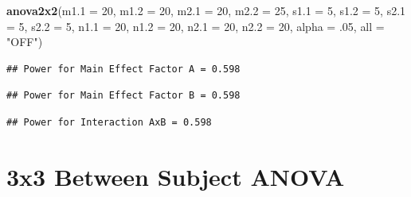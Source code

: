 \documentclass[]{book}
\newenvironment{Shaded}{\begin{snugshade}}{\end{snugshade}}
\newcommand{\DataTypeTok}[1]{\textcolor[rgb]{0.13,0.29,0.53}{#1}}
\newcommand{\DecValTok}[1]{\textcolor[rgb]{0.00,0.00,0.81}{#1}}
\newcommand{\FloatTok}[1]{\textcolor[rgb]{0.00,0.00,0.81}{#1}}
\newcommand{\KeywordTok}[1]{\textcolor[rgb]{0.13,0.29,0.53}{\textbf{#1}}}
\newcommand{\NormalTok}[1]{#1}
\newcommand{\StringTok}[1]{\textcolor[rgb]{0.31,0.60,0.02}{#1}}
\begin{document}
\begin{Shaded}
\begin{Highlighting}[]
\KeywordTok{anova2x2}\NormalTok{(}\DataTypeTok{m1.1 =} \DecValTok{20}\NormalTok{,}
         \DataTypeTok{m1.2 =} \DecValTok{20}\NormalTok{,}
         \DataTypeTok{m2.1 =} \DecValTok{20}\NormalTok{,}
         \DataTypeTok{m2.2 =} \DecValTok{25}\NormalTok{,}
         \DataTypeTok{s1.1 =} \DecValTok{5}\NormalTok{,}
         \DataTypeTok{s1.2 =} \DecValTok{5}\NormalTok{,}
         \DataTypeTok{s2.1 =} \DecValTok{5}\NormalTok{,}
         \DataTypeTok{s2.2 =} \DecValTok{5}\NormalTok{,}
         \DataTypeTok{n1.1 =} \DecValTok{20}\NormalTok{,}
         \DataTypeTok{n1.2 =} \DecValTok{20}\NormalTok{,}
         \DataTypeTok{n2.1 =} \DecValTok{20}\NormalTok{,}
         \DataTypeTok{n2.2 =} \DecValTok{20}\NormalTok{,}
         \DataTypeTok{alpha =} \FloatTok{.05}\NormalTok{,}
         \DataTypeTok{all =} \StringTok{"OFF"}\NormalTok{)}
\end{Highlighting}
\end{Shaded}

\begin{verbatim}
## Power for Main Effect Factor A = 0.598
\end{verbatim}

\begin{verbatim}
## Power for Main Effect Factor B = 0.598
\end{verbatim}

\begin{verbatim}
## Power for Interaction AxB = 0.598
\end{verbatim}

\hypertarget{x3-between-subject-anova}{%
\section{3x3 Between Subject ANOVA}\label{x3-between-subject-anova}}
\end{document}
